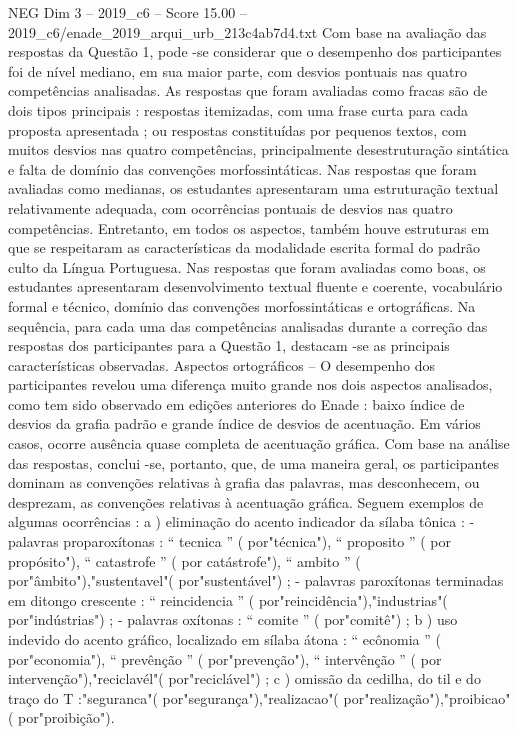 \begin{textsample}{NEG Dim 3 – 2019\_c6 – Score 15.00 – 2019\_c6/enade\_2019\_arqui\_urb\_213c4ab7d4.txt}
Com base na avaliação das respostas da Questão 1, pode -se considerar que o desempenho dos participantes foi de nível mediano, em sua maior parte, com desvios pontuais nas quatro competências analisadas.
As respostas que foram avaliadas como fracas são de dois tipos principais : respostas itemizadas, com uma frase curta para cada proposta apresentada ; ou respostas constituídas por pequenos textos, com muitos desvios nas quatro competências, principalmente desestruturação sintática e falta de domínio das convenções morfossintáticas.
Nas respostas que foram avaliadas como medianas, os estudantes apresentaram uma estruturação textual relativamente adequada, com ocorrências pontuais de desvios nas quatro competências.
Entretanto, em todos os aspectos, também houve estruturas em que se respeitaram as características da modalidade escrita formal do padrão culto da Língua Portuguesa.
Nas respostas que foram avaliadas como boas, os estudantes apresentaram desenvolvimento textual fluente e coerente, vocabulário formal e técnico, domínio das convenções morfossintáticas e ortográficas.
Na sequência, para cada uma das competências analisadas durante a correção das respostas dos participantes para a Questão 1, destacam -se as principais características observadas.
Aspectos ortográficos – O desempenho dos participantes revelou uma diferença muito grande nos dois aspectos analisados, como tem sido observado em edições anteriores do Enade : baixo índice de desvios da grafia padrão e grande índice de desvios de acentuação.
Em vários casos, ocorre ausência quase completa de acentuação gráfica.
Com base na análise das respostas, conclui -se, portanto, que, de uma maneira geral, os participantes dominam as convenções relativas à grafia das palavras, mas desconhecem, ou desprezam, as convenções relativas à acentuação gráfica.
Seguem exemplos de algumas ocorrências : a ) eliminação do acento indicador da sílaba tônica : - palavras proparoxítonas : “ tecnica ” ( por"técnica"), “ proposito ” ( por propósito"), “ catastrofe ” ( por catástrofe"), “ ambito ” ( por"âmbito"),"sustentavel"( por"sustentável") ; - palavras paroxítonas terminadas em ditongo crescente : “ reincidencia ” ( por"reincidência"),"industrias"( por"indústrias") ; - palavras oxítonas : “ comite ” ( por"comitê") ; b ) uso indevido do acento gráfico, localizado em sílaba átona : “ ecônomia ” ( por"economia"), “ prevênção ” ( por"prevenção"), “ intervênção ” ( por intervenção"),"reciclavél"( por"reciclável") ; c ) omissão da cedilha, do til e do traço do T :"seguranca"( por"segurança"),"realizacao"( por"realização"),"proibicao"( por"proibição").

\end{textsample}
